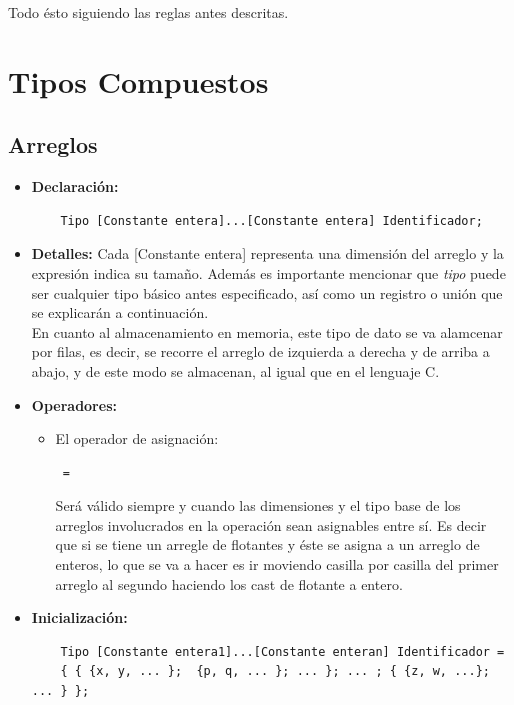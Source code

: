 \documentclass[11pt, spanish]{report}
\begin{document}
  Todo \'esto siguiendo las reglas antes descritas.


\section{Tipos Compuestos}

\subsection{Arreglos}
\begin{itemize}
\item \textbf{Declaraci\'on:}
  \begin{verbatim}
    Tipo [Constante entera]...[Constante entera] Identificador;
  \end{verbatim}
\item \textbf{Detalles:}
  Cada [Constante entera] representa una dimensi\'on del arreglo y la expresi\'on indica su tama\~no. Adem\'as es importante mencionar que \emph{tipo} puede ser cualquier tipo b\'asico antes especificado, as\'i como un registro o uni\'on que se explicar\'an a continuaci\'on.\\
  
  En cuanto al almacenamiento en memoria, este tipo de dato se va alamcenar por filas, es decir, se recorre el arreglo de izquierda a derecha y de 
  arriba a abajo, y de este modo se almacenan, al igual que en el lenguaje C.\\

\item \textbf{Operadores:}
  \begin{itemize}
  \item El operador de asignaci\'on:
    \begin{verbatim} = \end{verbatim}
    Ser\'a v\'alido siempre y cuando las dimensiones y el tipo base de los arreglos involucrados en la operaci\'on sean asignables entre s\'i. Es 
    decir que si se tiene un arregle de flotantes y \'este se asigna a un arreglo de enteros, lo que se va a hacer es ir moviendo casilla por casilla
    del primer arreglo al segundo haciendo los cast de flotante a entero.
  \end{itemize}
\item \textbf{Inicializaci\'on:}
  \begin{verbatim}
    Tipo [Constante entera1]...[Constante enteran] Identificador = 
    { { {x, y, ... };  {p, q, ... }; ... }; ... ; { {z, w, ...}; ... } };
  \end{verbatim}


\end{itemize}
\end{document}
